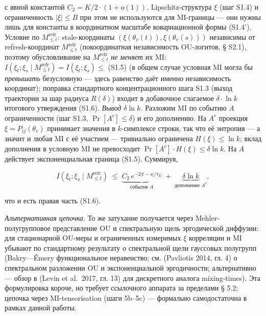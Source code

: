 \documentclass[pdflatex,sn-mathphys-ay]{sn-jnl}
\begin{document}
с явной константой \(C_2 = K/2 \cdot (1 + o(1))\). Lipschitz-структура \(\xi\) (шаг S1.4) и ограниченность \(|\xi| \le B\) при этом не используются для MI-границы --- они нужны лишь для константы в координатном масштабе ковариационной формы (S1.4'). Условие по \(M_{\le t}^{\text{refr}}\): stale-координаты \((\xi(\theta_v(t)), \xi(\theta_v(s)))\) независимы от refresh-координат \(M_{\le t}^{\text{refr}}\) (покоординатная независимость OU-логитов, § S2.1), поэтому обусловливание на \(M_{\le t}^{\text{refr}}\) \emph{не меняет} их MI: \(I(\xi_t;\xi_s\mid M_{\le t}^{\text{refr}}) = I(\xi_t;\xi_s) \le\) (S1.5) (в общем случае условная MI могла бы \emph{превышать} безусловную --- здесь равенство даёт именно независимость координат); поправка стандартного концентрационного шага S1.3 (выход траектории за шар радиуса \(R(\delta)\)) входит в добавочное слагаемое \(\delta \cdot \ln k\) итогового утверждения (S1.6). \emph{Вывод \(\delta\ln k\).} Разложим MI по событию \(A\) ограниченности (шаг S1.3, \(\Pr[A^c]\le\delta\)) и его дополнению. На \(A^c\) проекция \(\xi = P_{ij}(\theta_v)\) принимает значения в \(k\)-симплексе строки, так что её энтропия --- а значит и любая MI с её участием --- тривиально ограничена \(H(\xi) \le \ln k\); вклад дополнения в условную MI не превосходит \(\Pr[A^c]\cdot H(\xi) \le \delta\ln k\). На \(A\) действует экспоненциальная граница (S1.5). Суммируя,



\[I(\xi_t;\xi_s\mid M_{\le t}^{\text{refr}}) \;\le\; \underbrace{C_2\,e^{-2|t-s|/\tau_E}}_{\text{событие }A} \;+\; \underbrace{\delta\ln k}_{\text{дополнение }A^c},\]



что и есть правая часть (S1.6).



\emph{Альтернативная цепочка.} То же затухание получается через Mehler-полугрупповое представление OU и спектральную щель эргодической диффузии: для стационарной OU-меры и ограниченных измеримых \(\xi\) корреляции и MI убывают по стандартному результату о спектральной щели гауссовых полугрупп (Bakry---Émery функциональное неравенство; см. (Pavliotis 2014, гл. 4) о спектральном разложении OU и экспоненциальной эргодичности; альтернативно --- обзор в (Levin et al.~2017, гл. 13) для дискретного аналога mixing-times). Эта формулировка короче, но требует ссылочного аппарата за пределами § 5.2; цепочка через MI-tensorisation (шаги 5b--5c) --- формально самодостаточна в рамках данной работы.
\end{document}
